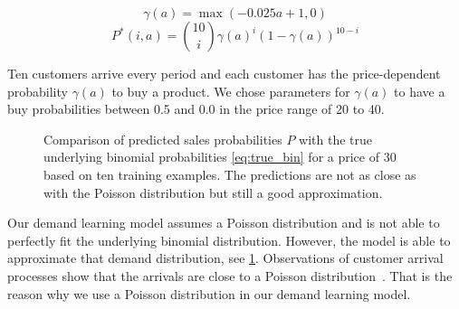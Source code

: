 \begin{equation}
\gamma(a) = \max(-0.025 a + 1, 0)
\end{equation}
\begin{equation}
P^*(i, a) = \binom{10}{i} \gamma(a)^i (1 - \gamma(a))^{10-i}
\label{eq:true_bin}
\end{equation}

Ten customers arrive every period and each customer has the price-dependent probability $\gamma(a)$ to buy a product.
We chose parameters for $\gamma(a)$ to have a buy probabilities between 0.5 and 0.0 in the price range of 20 to 40.

\begin{figure}[t]
	\caption[Comparison of Predicted Probabilites with Underlying Binomial Probabilities]{Comparison of predicted sales probabilities $P$ with the true underlying binomial probabilities \cref{eq:true_bin} for a price of 30 based on ten training examples. The predictions are not as close as with the Poisson distribution but still a good approximation.}
	\label{fig:probs_binom}
\end{figure}

Our demand learning model assumes a Poisson distribution and is not able to perfectly fit the underlying binomial distribution.
However, the model is able to approximate that demand distribution, see \cref{fig:probs_binom}.
Observations of customer arrival processes show that the arrivals are close to a Poisson distribution~\cite{DBLP:journals/ior/Wolff82}.
That is the reason why we use a Poisson distribution in our demand learning model.

